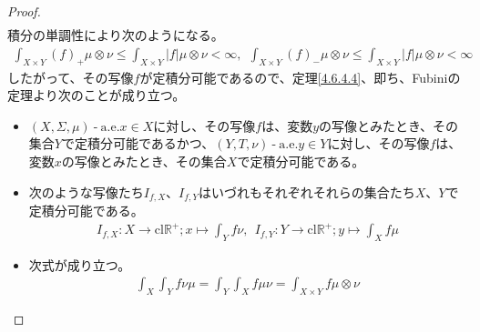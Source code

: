 \documentclass[dvipdfmx]{jsarticle}
\begin{document}
\begin{proof}
\begin{align*}
\end{align*}
積分の単調性により次のようになる。
\begin{align*}
\int_{X \times Y} {(f)_{+}\mu \otimes \nu} \leq \int_{X \times Y} {|f|\mu \otimes \nu} < \infty,\ \ \int_{X \times Y} {(f)_{-}\mu \otimes \nu} \leq \int_{X \times Y} {|f|\mu \otimes \nu} < \infty
\end{align*}
したがって、その写像$f$が定積分可能であるので、定理\ref{4.6.4.4}、即ち、Fubiniの定理より次のことが成り立つ。
\begin{itemize}
\item
  $(X,\varSigma,\mu) \ \text{-} \ \mathrm{a.e.}x \in X$に対し、その写像$f$は、変数$y$の写像とみたとき、その集合$Y$で定積分可能であるかつ、$(Y,T,\nu) \ \text{-} \ \mathrm{a.e.}y \in Y$に対し、その写像$f$は、変数$x$の写像とみたとき、その集合$X$で定積分可能である。
\item
  次のような写像たち$I_{f,X}$、$I_{f,Y}$はいづれもそれぞれそれらの集合たち$X$、$Y$で定積分可能である。
\begin{align*}
I_{f,X}:X \rightarrow \mathrm{cl}\mathbb{R}^{+};x \mapsto \int_{Y} {f\nu},\ \ I_{f,Y}:Y \rightarrow \mathrm{cl}\mathbb{R}^{+};y \mapsto \int_{X} {f\mu}
\end{align*}
\item
  次式が成り立つ。
\begin{align*}
\int_{X} {\int_{Y} {f\nu}\mu} = \int_{Y} {\int_{X} {f\mu}\nu} = \int_{X \times Y} {f\mu \otimes \nu}
\end{align*}
\end{itemize}
\end{proof}
\end{document}
